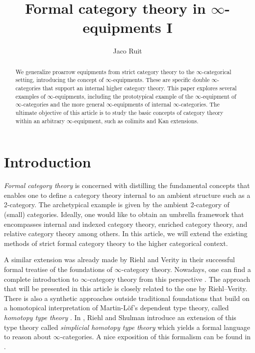 \documentclass[a4paper, 11pt]{amsart}
\title{Formal category theory in $\infty$-equipments I}
\author{Jaco Ruit}
\numberwithin{theorem}{section}
\theoremstyle{definition}
\begin{document}
\begin{abstract}
	We generalize proarrow equipments from strict category theory to the $\infty$-cate\-go\-rical setting, 
	introducing the concept of $\infty$-equipments. These are specific  
	 double $\infty$-categories that support an internal higher category theory. This paper explores several examples of $\infty$-equip\-ments, including the prototypical example of the $\infty$-equipment 
	of $\infty$-categories and the more general $\infty$-equipments of internal $\infty$-categories.
	The ultimate objective of this article is to study the basic concepts of category theory within an arbitrary $\infty$-equipment, such as colimits and Kan extensions.
\end{abstract}

\maketitle


\setcounter{tocdepth}{1}
\tableofcontents


\vspace{16mm}

\section{Introduction} 

\textit{Formal category theory} is concerned with distilling the fundamental concepts that enables one to define a category theory internal to an ambient structure such as a 2-category.
The archetypical example is given by the ambient 2-category of (small) categories. Ideally, one would like to obtain an umbrella framework  
that encompasses internal and indexed category theory, enriched category theory, and relative category theory among others. 
In this article, we will extend the existing methods of strict formal category theory to the higher categorical context. 

A similar extension was already made by Riehl and Verity in their successful formal treatise of the foundations 
of $\infty$-category theory. Nowadays, one can find a complete introduction to $\infty$-category theory from this perspective \cite{RiehlVerity}. 
The approach that will be presented 
in this article is closely related to the one by Riehl--Verity. There is also a synthetic approaches outside traditional foundations that build on a homotopical interpretation of Martin-L\"of's dependent type theory, called \textit{homotopy type theory} \cite{hottbook}. 
In \cite{RiehlShulman}, Riehl and Shulman introduce an extension of this type theory called \textit{simplicial homotopy type theory} which yields a formal language to reason about $\infty$-categories.
A nice exposition of this formalism can be found in \cite[Section 4]{RiehlUndergrads}. 
\end{document}
